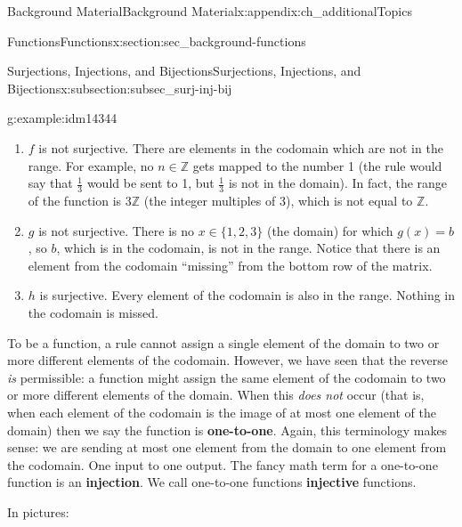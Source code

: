 \documentclass[oneside,10pt,]{book}
\newcommand{\terminology}[1]{\textbf{#1}}
\numberwithin{equation}{chapter}
\def\Z{\mathbb Z}
\begin{document}
\begin{appendixptx}{Background Material}{}{Background Material}{}{}{x:appendix:ch_additionalTopics}
\begin{sectionptx}{Functions}{}{Functions}{}{}{x:section:sec_background-functions}
\begin{subsectionptx}{Surjections, Injections, and Bijections}{}{Surjections, Injections, and Bijections}{}{}{x:subsection:subsec_surj-inj-bij}
\begin{example}{}{g:example:idm14344}
\begin{enumerate}
\item{}\(f\) is not surjective. There are elements in the codomain which are not in the range. For example, no \(n \in \Z\) gets mapped to the number 1 (the rule would say that \(\frac{1}{3}\) would be sent to 1, but \(\frac{1}{3}\) is not in the domain). In fact, the range of the function is \(3\Z\) (the integer multiples of 3), which is not equal to \(\Z\).%
\item{}\(g\) is not surjective. There is no \(x \in \{1,2,3\}\) (the domain) for which \(g(x) = b\), so \(b\), which is in the codomain, is not in the range. Notice that there is an element from the codomain ``missing'' from the bottom row of the matrix.%
\item{}\(h\) is surjective. Every element of the codomain is also in the range. Nothing in the codomain is missed.%
\end{enumerate}
%
\end{example}
To be a function, a rule cannot assign a single element of the domain to two or more different elements of the codomain. However, we have seen that the reverse \emph{is} permissible: a function might assign the same element of the codomain to two or more different elements of the domain. When this \emph{does not} occur (that is, when each element of the codomain is the image of at most one element of the domain) then we say the function is \terminology{one-to-one}. Again, this terminology makes sense: we are sending at most one element from the domain to one element from the codomain. One input to one output. The fancy math term for a one-to-one function is an \terminology{injection}. We call one-to-one functions \terminology{injective} functions.%
\par
In pictures:%
\begin{sidebyside}{2}{0.05}{0.05}{0.1}%
\begin{sbspanel}{0.4}%
%
\end{sbspanel}%

\end{sidebyside}
\end{subsectionptx}
\end{sectionptx}
\end{appendixptx}
\end{document}
